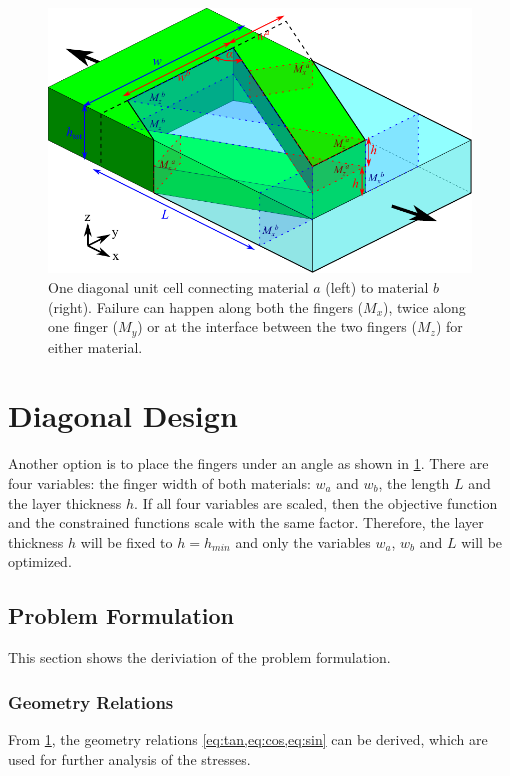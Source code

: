 
\begin{figure}[H]
	\centering
	\includegraphics[width=\columnwidth]{sources/method/diagonal_model_v3.pdf}
	\caption{
		One diagonal unit cell connecting material $a$ (left) to material $b$ (right).
		Failure can happen along both the fingers ($M_x$), twice along one finger ($M_y$) or at the interface between the two fingers ($M_z$) for either material.}
	\label{fig:diagonal_model}
\end{figure}


\section{Diagonal Design}

Another option is to place the fingers under an angle as shown in \cref{fig:diagonal_model}.
There are four variables: the finger width of both materials: $w_a$ and $w_b$, the length $L$ and the layer thickness $h$. 
If all four variables are scaled, then the objective function and the constrained functions scale with the same factor. 
Therefore, the layer thickness $h$ will be fixed to $h = h_{min}$ and only the variables $w_a$, $w_b$ and $L$ will be optimized.

\subsection{Problem Formulation}
This section shows the deriviation of the problem formulation.

\subsubsection{Geometry Relations}
From \cref{fig:diagonal_model}, the geometry relations \cref{eq:tan,eq:cos,eq:sin} can be derived, which are used for further analysis of the stresses.

